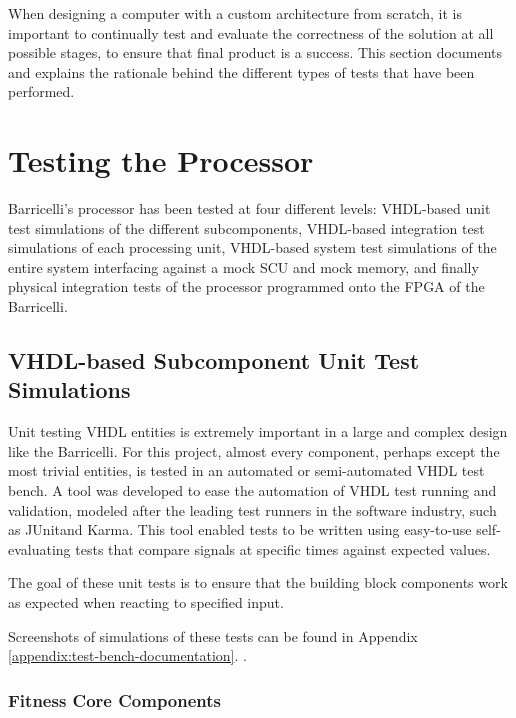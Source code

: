 When designing a computer with a custom architecture from scratch, it is important to continually test and evaluate the correctness of the solution at all possible stages, to ensure that final product is a success.
This section documents and explains the rationale behind the different types of tests that have been performed.

\section{Testing the Processor}

Barricelli's processor has been tested at four different levels: \gls{VHDL}-based unit test simulations of the different subcomponents,  \gls{VHDL}-based integration test simulations of each processing unit, \gls{VHDL}-based system test simulations of the entire system interfacing against a mock SCU and mock memory, and finally physical integration tests of the processor programmed onto the FPGA of the Barricelli.


\subsection{\gls{VHDL}-based Subcomponent Unit Test Simulations}

Unit testing VHDL entities is extremely important in a large and complex design like the Barricelli.
For this project, almost every component, perhaps except the most trivial entities, is tested in an automated or semi-automated VHDL test bench.
A tool was developed to ease the automation of VHDL test running and validation, modeled after the leading test runners in the software industry, such as JUnit\cn and Karma\cn.
This tool enabled tests to be written using easy-to-use self-evaluating tests that compare signals at specific times against expected values.

The goal of these unit tests is to ensure that the building block components work as expected when reacting to specified input.

Screenshots of simulations of these tests can be found in Appendix \ref{appendix:test-bench-documentation}.
.

\subsubsection{Fitness Core Components}

